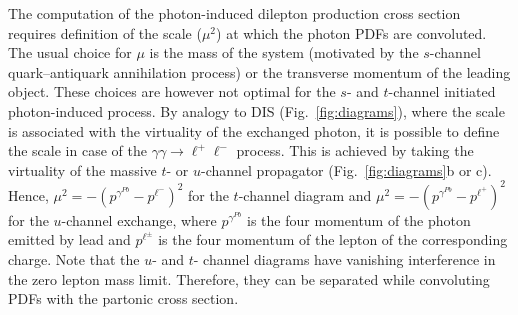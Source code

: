 The computation of the photon-induced dilepton production cross section  requires definition of the  scale ($\mu^2$) at which the photon PDFs are convoluted.
The usual choice for $\mu$ is the mass of the system (motivated by the $s$-channel quark--antiquark annihilation process) or the transverse momentum of the leading object. 
These choices are however not optimal for the $s$- and $t$-channel initiated photon-induced process.
By analogy to DIS (Fig.~\ref{fig:diagrams}), where the scale is associated with the virtuality of the exchanged photon,
it is possible to define the scale in case of the $\gamma\gamma\rightarrow\ell^+\ell^-$ process.
This is achieved by taking the virtuality of the massive $t$- or $u$-channel propagator (Fig.~\ref{fig:diagrams}b or c).
Hence, $\mu^2 = -(p^{\gamma^{Pb}}-p^{\ell^-})^2$ for the $t$-channel diagram and $\mu^2 = -(p^{\gamma^{Pb}}-p^{\ell^+})^2$ for the $u$-channel exchange, where $p^{\gamma^{Pb}}$ is the four momentum
of the photon emitted by lead and $p^{\ell^{\pm}}$ is the four momentum of the lepton of the corresponding charge.
Note that the $u$- and $t$- channel diagrams have vanishing interference in the zero lepton mass limit. Therefore, they can be separated  while convoluting PDFs with the partonic cross section.

